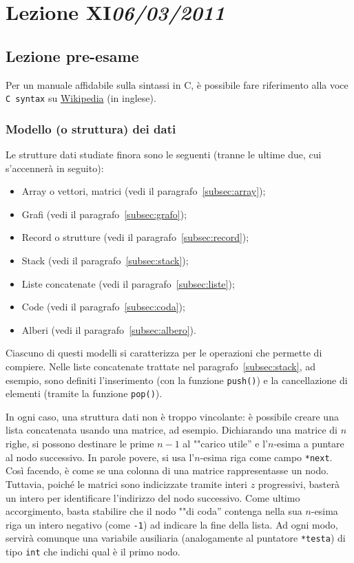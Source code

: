 \chapter[Lezione XI]{Lezione XI\newline\small{\emph{06/03/2011}}}
	\section{Lezione pre-esame}
Per un manuale affidabile sulla sintassi in C, è possibile fare riferimento alla voce \lstinline!C syntax! su \href{http://en.wikipedia.org/wiki/Main_Page}{Wikipedia} (in inglese).
		\subsection{Modello (o struttura) dei dati}
Le strutture dati studiate finora sono le seguenti (tranne le ultime due, cui s'accennerà in seguito):
\begin{itemize}[noitemsep]
	\item
Array o vettori, matrici (vedi il paragrafo~\vref{subsec:array});
	\item
Grafi (vedi il paragrafo~\vref{subsec:grafo});
	\item
Record o strutture (vedi il paragrafo~\vref{subsec:record});
	\item
Stack (vedi il paragrafo~\vref{subsec:stack});
	\item
Liste concatenate (vedi il paragrafo~\vref{subsec:liste});
	\item
Code (vedi il paragrafo~\vref{subsec:coda});
	\item
Alberi (vedi il paragrafo~\vref{subsec:albero}).
\end{itemize}
Ciascuno di questi modelli si caratterizza per le operazioni che permette di compiere. Nelle liste concatenate trattate nel  paragrafo~\vref{subsec:stack}, ad esempio, sono definiti l'inserimento (con la funzione \lstinline!push()!) e la cancellazione di elementi (tramite la funzione \lstinline!pop()!).

In ogni caso, una struttura dati non è troppo vincolante: è possibile creare una lista concatenata usando una matrice, ad esempio. Dichiarando una matrice di $n$ righe, si possono destinare le prime $n-1$ al ""carico utile'' e l'$n$-esima a puntare al nodo successivo. In parole povere, si usa l'$n$-esima riga come campo \lstinline!*next!. Così facendo, è come se una colonna di una matrice rappresentasse un nodo. Tuttavia, poiché le matrici sono indicizzate tramite interi $z$ progressivi, basterà un intero per identificare l'indirizzo del nodo successivo. Come ultimo accorgimento, basta stabilire che il nodo ""di coda'' contenga nella sua $n$-esima riga un intero negativo (come \lstinline!-1!) ad indicare la fine della lista. Ad ogni modo, servirà comunque una variabile ausiliaria (analogamente al puntatore \lstinline!*testa!) di tipo \lstinline!int! che indichi qual è il primo nodo.

